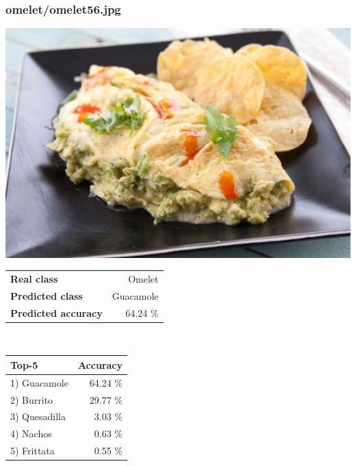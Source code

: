 \subsubsection{omelet/omelet56.jpg}

\begin{minipage}[t]{0.4\textwidth}
	\vspace{0pt}
	\includegraphics[width=\linewidth]{images/evaluation-images/omelet/omelet56.jpg}
\end{minipage}
\hfill
\begin{minipage}[t]{0.5\textwidth}
	\vspace{0pt}\raggedright
	\begin{tabularx}{\textwidth}{X r}
		\small \textbf{Real class} & \small Omelet\\
		\small \textbf{Predicted class} & \small Guacamole\\
		\small \textbf{Predicted accuracy} & \small 64.24 \%
    \end{tabularx}\\
    
    \vspace{6pt}
	\begin{tabularx}{\textwidth}{X r}
        \small \textbf{Top-5} & \small \textbf{Accuracy} \\
        \hline
		\small 1) Guacamole & \small 64.24 \%\\\small 2) Burrito & \small 29.77 \%\\\small 3) Quesadilla & \small 3.03 \%\\\small 4) Nachos & \small 0.63 \%\\\small 5) Frittata & \small 0.55 \%
    \end{tabularx}
\end{minipage}
    
